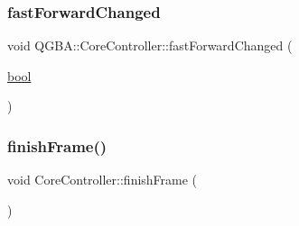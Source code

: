 \subsubsection{\texorpdfstring{fast\+Forward\+Changed}{fastForwardChanged}}
{\footnotesize\ttfamily void Q\+G\+B\+A\+::\+Core\+Controller\+::fast\+Forward\+Changed (\begin{DoxyParamCaption}\item[{\mbox{\hyperlink{libretro_8h_a4a26dcae73fb7e1528214a068aca317e}{bool}}}]{ }\end{DoxyParamCaption})\hspace{0.3cm}{\ttfamily [signal]}}

\mbox{\label{class_q_g_b_a_1_1_core_controller_a6cce655789c611379527dafbd9726109}} 
\subsubsection{\texorpdfstring{finish\+Frame()}{finishFrame()}}
{\footnotesize\ttfamily void Core\+Controller\+::finish\+Frame (\begin{DoxyParamCaption}{ }\end{DoxyParamCaption})\hspace{0.3cm}{\ttfamily [private]}}

